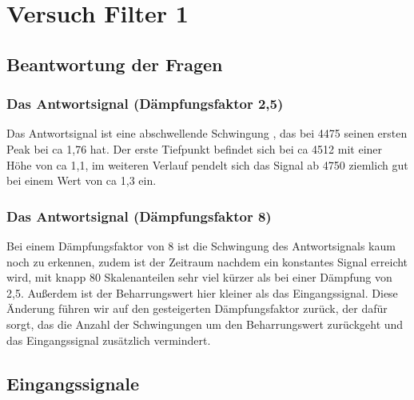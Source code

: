 




\maketitle



\tableofcontents

\newpage



\section{Versuch Filter 1}


\subsection{Beantwortung der Fragen}

\subsubsection*{Das Antwortsignal (Dämpfungsfaktor 2,5)}

Das Antwortsignal ist eine abschwellende Schwingung , das bei 4475 seinen ersten Peak bei ca 1,76 hat. Der erste Tiefpunkt befindet sich bei ca 4512 mit einer Höhe von ca 1,1, im weiteren Verlauf pendelt sich das Signal ab 4750 ziemlich gut bei einem Wert von ca 1,3 ein.


\subsubsection*{Das Antwortsignal (Dämpfungsfaktor 8)}

Bei einem Dämpfungsfaktor von 8 ist die Schwingung des Antwortsignals kaum noch zu erkennen, zudem ist der Zeitraum nachdem ein konstantes Signal erreicht wird, mit knapp 80 Skalenanteilen sehr viel kürzer als bei einer Dämpfung von 2,5. Außerdem ist der Beharrungswert hier kleiner als das Eingangssignal. Diese Änderung führen wir auf den gesteigerten Dämpfungsfaktor zurück, der dafür sorgt, das die Anzahl der Schwingungen um den Beharrungswert zurückgeht und das Eingangssignal zusätzlich vermindert.


\subsection{Eingangssignale}

